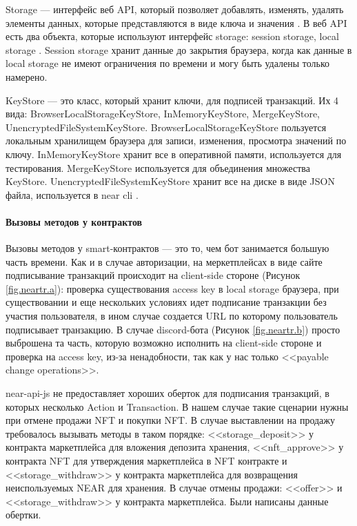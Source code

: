 \begin{definition}
    Storage --- интерфейс веб API, который позволяет добавлять, изменять, удалять элементы данных, которые представляются в виде ключа и значения \cite{webapistorage}. В веб API есть два объекта, которые используют интерфейс storage: session storage, local storage \cite{webapilocalstorage}. Session storage хранит данные до закрытия браузера, когда как данные в local storage не имеют ограничения по времени и могу быть удалены только намерено.
\end{definition}

\begin{definition}
    KeyStore \cite{nearclasskeystore} --- это класс, который хранит ключи, для подписей транзакций. Их 4 вида: BrowserLocalStorageKeyStore, InMemoryKeyStore, MergeKeyStore, UnencryptedFileSystemKeyStore. BrowserLocalStorageKeyStore пользуется локальным хранилищем браузера для записи, изменения, просмотра значений по ключу. InMemoryKeyStore хранит все в оперативной памяти, используется для тестирования. MergeKeyStore используется для объединения множества KeyStore. UnencryptedFileSystemKeyStore хранит все на диске в виде JSON файла, используется в near cli \cite{nearcli}.
\end{definition}

\paragraph{Вызовы методов у контрактов}

Вызовы методов у smart-контрактов --- это то, чем бот занимается большую часть времени. Как и в случае авторизации, на меркетплейсах в виде сайте подписывание транзакций происходит на client-side стороне (Рисунок {\color{blue} \ref{fig.neartr.a}}): проверка существования access key в local storage браузера, при существовании и еще нескольких условиях идет подписание транзакции без участия пользователя, в ином случае создается URL по которому пользователь подписывает транзакцию. В случае discord-бота (Рисунок {\color{blue} \ref{fig.neartr.b}}) просто выброшена та часть, которую возможно исполнить на client-side стороне и проверка на access key, из-за ненадобности, так как у нас только <<payable change operations>>.

near-api-js не предоставляет хороших оберток для подписания транзакций, в которых несколько Action и Transaction. В нашем случае такие сценарии нужны при отмене продажи NFT и покупки NFT. В случае выставлении на продажу требовалось вызывать методы в таком порядке: <<storage\_deposit>> у контракта маркетплейса для вложения депозита хранения, <<nft\_approve>> у контракта NFT для утверждения маркетплейса в NFT контракте и <<storage\_withdraw>> у контракта маркетплейса для возвращения неиспользуемых NEAR для хранения. В случае отмены продажи: <<offer>> и <<storage\_withdraw>> у контракта маркетплейса. Были написаны данные обертки.

